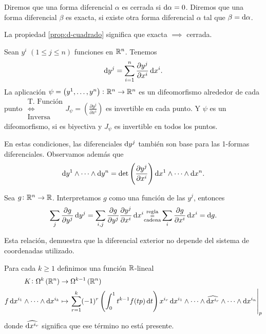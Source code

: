 \begin{defi}
    Diremos que una forma diferencial $\alpha$ es cerrada si $\dif \alpha =0$. Diremos que una forma diferencial $\beta$ es exacta, si existe otra
    forma diferencial $\alpha$ tal que $\beta = \dif \alpha$.
\end{defi}

\begin{obs*}
    La propiedad \ref{prop:d-cuadrado} significa que exacta $\implies$ cerrada.
\end{obs*}

\begin{prop}
    Sean $y^i$ $(1 \leq j \leq n)$ funciones en $\mathbb{R}^n$. Tenemos
    \[
        \dif y^j = \sum^n_{i=1} \frac{\partial y^j}{\partial x^i} \dif x^i.
    \]
    La aplicación $\psi = \left( y^1, \dots, y^n \right) \colon \mathbb{R}^n \to \mathbb{R}^n$ es un difeomorfismo alrededor de cada punto
    $\substack{\text{T. Función} \\ \iff \\ \text{Inversa}} J_\psi = \left( \frac{\partial y^j}{\partial x^i} \right)$ es invertible en cada punto.
    Y $\psi$ es un difeomorfismo, si es biyectiva y $J_\psi$ es invertible en todos los puntos.

    En estas condiciones, las diferenciales $\dif y^j$ tambi\'en son base para las 1-formas diferenciales. Observamos además que
    \[
        \dif y^1 \wedge \cdots \wedge \dif y^n = \det \left( \frac{\partial y^j}{\partial x^i} \right) \dif x^1 \wedge \cdots \wedge \dif x^n.
    \]
\end{prop}

\begin{obs}
    Sea $g \colon \mathbb{R}^n \to \mathbb{R}$. Interpretamos $g$ como una función de las $y^j$, entonces
    \[
        \sum_j \frac{\partial g}{\partial y^j} \dif y^j = \sum_{i, j} \frac{\partial g}{\partial y^j} \frac{\partial y^j}{\partial x^i} \dif x^i
        \substack{\text{regla} \\ = \\ \text{cadena}} \sum_i \frac{\partial g}{\partial x^i} \dif x^i = \dif g.
    \]

    Esta relación, demuestra que la diferencial exterior no depende del sistema de coordenadas utilizado.
\end{obs}

\begin{defi}
    Para cada $k \geq 1$ definimos una función $\mathbb{R}$-lineal
    \[
        \begin{aligned}
            K \colon \Omega^k\left( \real^n \right) &\to \Omega^{k-1}\left( \real^n \right) \\
            f \dif x^{i_1} \wedge \cdots \wedge \dif x^{i_k} &\mapsto \left. \sum^k_{r=1} (-1)^r \left( \int^1_0 t^{k-1} f(tp) \dif t\right) x^{i_r}
            \dif x^{i_1} \wedge \cdots \wedge \widehat{\dif x^{i_r}} \wedge \cdots \wedge \dif x^{i_n} \right\vert_p
        \end{aligned}
    \]
    donde $\widehat{\dif x^{i_r}}$ significa que ese t\'ermino no está presente.
\end{defi}

